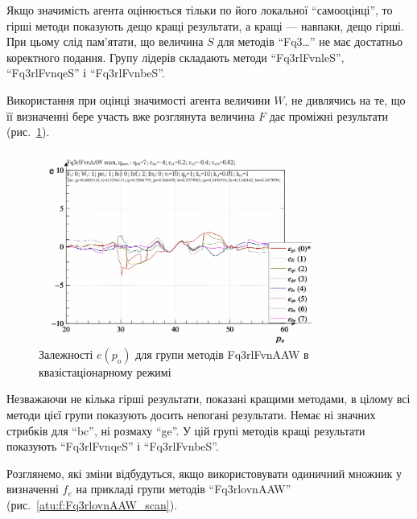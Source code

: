 Якщо значимість агента оцінюється тільки по його локальної
``самооцінці'', то гірші методи показують дещо кращі результати, а
кращі --- навпаки, дещо гірші. При цьому слід пам'ятати, що величина
$S$ для методів ``Fq3\ldots'' не має достатньо коректного
подання. Групу лідерів складають методи ``Fq3rlFvnleS'', ``Fq3rlFvnqeS'' і
``Fq3rlFvnbeS''.

Використання при оцінці значимості агента величини
$W$, не дивлячись на те, що її визначенні бере участь вже
розглянута величина
$F$ дає проміжні результати (рис.~\ref{atu:f:Fq3rlFvnAAW_scan}).

\begin{figure}[htb!]
  \begin{center}
    \includegraphics[width=0.8\textwidth]{p/scan/qls-p_p_e_Fq3rlFvnAAW_scan.png}
  \end{center}
  \caption{Залежності $e(p_o)$ для групи методів Fq3rlFvnAAW в квазістаціонарному режимі}
  \label{atu:f:Fq3rlFvnAAW_scan}
\end{figure}

Незважаючи не кілька гірші результати, показані кращими
методами, в цілому всі методи цієї групи показують досить
непогані результати. Немає ні значних стрибків для ``bc'', ні
розмаху ``ge''. У цій групі методів кращі результати показують
``Fq3rlFvnqeS'' і ``Fq3rlFvnbeS''.


Розглянемо, які зміни відбудуться, якщо використовувати
одиничний множник у визначенні
$f_e$ на прикладі групи методів ``Fq3rlovnAAW'' (рис.~\ref{atu:f:Fq3rlovnAAW_scan}).

